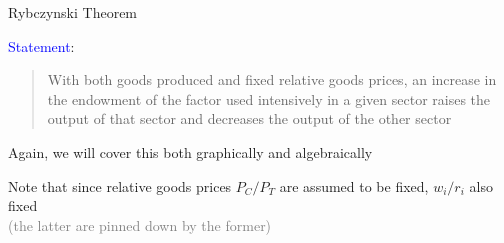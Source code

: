 \documentclass[notes,11pt, aspectratio=169, xcolor=table]{beamer}
\newcommand{\blue}[1]{\textcolor{blue}{#1}}
\newenvironment{wideitemize}{\itemize\addtolength{\itemsep}{10pt}}{\enditemize}
\begin{document}
\begin{frame}{Rybczynski Theorem}

        \begin{wideitemize}
            \item \blue{Statement}:

            \begin{quote}
                With both goods produced and fixed relative goods prices, an increase in the endowment of the factor used intensively in a given sector raises the output of that sector and decreases the output of the other sector
            \end{quote}

            \item<2-> Again, we will cover this both graphically and algebraically

            \item<3-> Note that since relative goods prices $P_C/P_T$ are assumed to be fixed, $w_i/r_i$ also fixed \\
                \qquad \textcolor{gray}{(the latter are pinned down by the former)}
                    
\end{wideitemize}
\end{frame}
\end{document}

